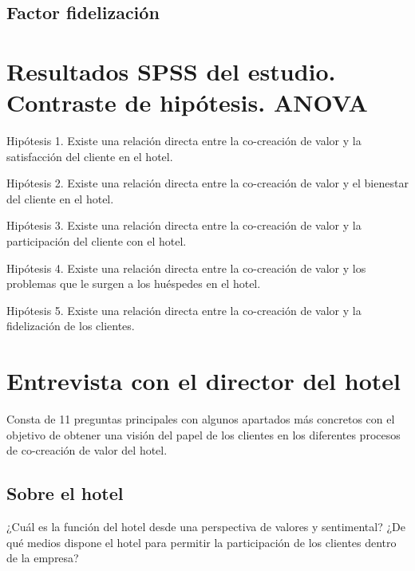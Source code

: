 \section{Factor fidelización}


\chapter{Resultados SPSS del estudio. Contraste de hipótesis. ANOVA}
\label{anexo:11}

Hipótesis 1. Existe una relación directa entre la co-creación de valor y la satisfacción del cliente en el hotel.



Hipótesis 2. Existe una relación directa entre la co-creación de valor y el bienestar del cliente en el hotel.



\newpage

Hipótesis 3. Existe una relación directa entre la co-creación de valor y la participación del cliente con el hotel.



Hipótesis 4. Existe una relación directa entre la co-creación de valor y los problemas que le surgen a los huéspedes en el hotel.



Hipótesis 5. Existe una relación directa entre la co-creación de valor y la fidelización de los clientes.



\chapter{Entrevista con el director del hotel}
\label{anexo:12}

Consta de 11 preguntas principales con algunos apartados más concretos con el objetivo de obtener una visión del papel de los clientes en los diferentes procesos de co-creación de valor del hotel.

\section*{Sobre el hotel}

¿Cuál es la función del hotel desde una perspectiva de valores y sentimental?
¿De qué medios dispone el hotel para permitir la participación de los clientes dentro de la empresa?

